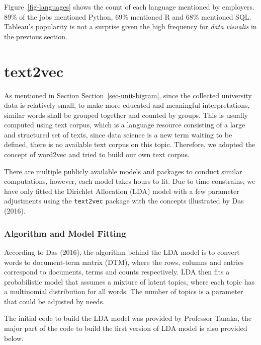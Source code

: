 \documentclass[
  letterpaper,
  DIV=11,
  numbers=noendperiod]{scrreport}
\begin{document}
Figure~\ref{fig-languages} shows the count of each language mentioned by
employers. 89\% of the jobs mentioned Python, 69\% mentioned R and 68\%
mentioned SQL. Tableau's popularity is not a surprise given the high
frequency for \emph{data visualis} in the previous section.

\part{text2vec}

As mentioned in Section Section~\ref{sec-unit-bigram}, since the
collected university data is relatively small, to make more educated and
meaningful interpretations, similar words shall be grouped together and
counted by groups. This is usually computed using text corpus, which is
a language resource consisting of a large and structured set of texts,
since data science is a new term waiting to be defined, there is no
available text corpus on this topic. Therefore, we adopted the concept
of word2vec and tried to build our own text corpus.

There are multiple publicly available models and packages to conduct
similar computations, however, each model takes hours to fit. Due to
time constrains, we have only fitted the Dirichlet Allocation (LDA)
model with a few parameter adjustments using the \texttt{text2vec}
package with the concepts illustrated by Das (2016).

\hypertarget{algorithm-and-model-fitting}{%
\section*{Algorithm and Model
Fitting}\label{algorithm-and-model-fitting}}

According to Das (2016), the algorithm behind the LDA model is to
convert words to document-term matrix (DTM), where the rows, columns and
entries correspond to documents, terms and counts respectively. LDA then
fits a probabilistic model that assumes a mixture of latent topics,
where each topic has a multinomial distribution for all words. The
number of topics is a parameter that could be adjusted by needs.

The initial code to build the LDA model was provided by Professor
Tanaka, the major part of the code to build the first version of LDA
model is also provided below.
\end{document}
